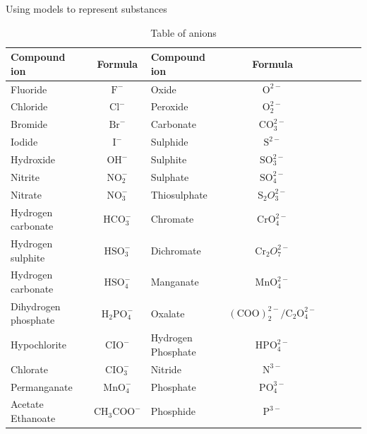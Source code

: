 \begin{activity}{Using models to represent substances}
\begin{enumerate}[noitemsep, label=\textbf{\arabic*}. ]
\begin{table}
\begin{center}
\begin{tabular}{|l|c|l|c|l|c|l|c|} \hline
\textbf{Compound ion} & \textbf{Formula}            & \textbf{Compound ion} & \textbf{Formula} \\ \hline
Fluoride             & $\mathrm{F}^{-}$             & Oxide              & $\mathrm{O}^{2-}$ \\ \hline
Chloride             & $\mathrm{Cl}^{-}$            & Peroxide           & $\mathrm{O}_{2}^{2-}$ \\ \hline
Bromide              & $\mathrm{Br}^{-}$            & Carbonate          & $\mathrm{CO}_{3}^{2-}$ \\ \hline
Iodide               & $\mathrm{I}^{-}$             & Sulphide           & $\mathrm{S}^{2-}$ \\ \hline
Hydroxide            & $\mathrm{OH}^{-}$            & Sulphite           & $\mathrm{SO}_{3}^{2-}$ \\ \hline
Nitrite              & $\mathrm{NO}_{2}^{-}$        & Sulphate           & $\mathrm{SO}_{4}^{2-}$ \\ \hline
Nitrate              & $\mathrm{NO}_{3}^{-}$        & Thiosulphate       & $\mathrm{S}_{2}{O}_{3}^{2-}$ \\ \hline
Hydrogen carbonate   & $\mathrm{HCO}_{3}^{-}$       & Chromate           & $\mathrm{CrO}_{4}^{2-}$ \\ \hline
Hydrogen sulphite    & $\mathrm{HSO}_{3}^{-}$       & Dichromate         & $\mathrm{Cr}_{2}{O}_{7}^{2-}$ \\ \hline
Hydrogen carbonate   & $\mathrm{HSO}_{4}^{-}$       & Manganate          & $\mathrm{MnO}_{4}^{2-}$ \\ \hline
Dihydrogen phosphate & $\mathrm{H}_{2}{\mathrm{PO}}_{4}^{-}$ & Oxalate            & $\mathrm{(COO)}_{2}^{2-}/{\mathrm{C}}_{2}{\mathrm{O}}_{4}^{2-}$ \\ \hline
Hypochlorite         & $\mathrm{CIO}^{-}$           & Hydrogen Phosphate & $\mathrm{HPO}_{4}^{2-}$ \\ \hline
Chlorate             & $\mathrm{CIO}_{3}^{-}$       & Nitride            & $\mathrm{N}^{3-}$ \\ \hline
Permanganate         & $\mathrm{MnO}_{4}^{-}$       & Phosphate          & $\mathrm{PO}_{4}^{3-}$ \\ \hline
Acetate Ethanoate    & $\mathrm{CH}_{3}{\mathrm{COO}}^{-}$   & Phosphide          & $\mathrm{P}^{3-}$ \\ \hline
\end{tabular}

 \end{center}
\caption{Table of anions}
\label{tab:anions}
\end{table}


\end{enumerate}
\end{activity}
